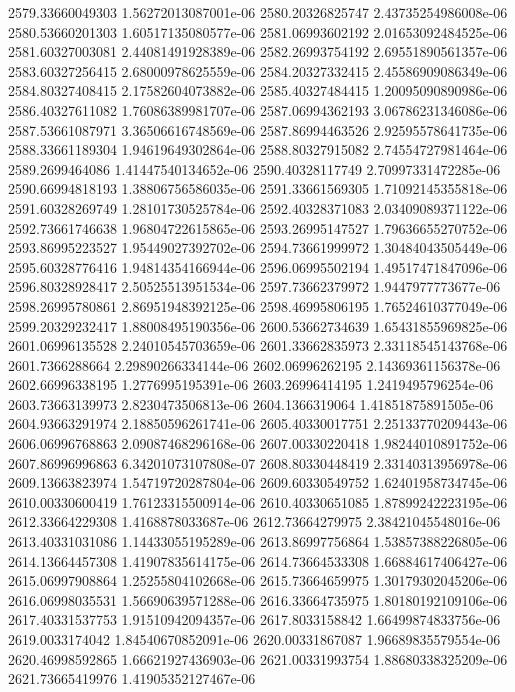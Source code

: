 {2579.33660049303 1.56272013087001e-06
2580.20326825747 2.43735254986008e-06
2580.53660201303 1.60517135080577e-06
2581.06993602192 2.01653092484525e-06
2581.60327003081 2.44081491928389e-06
2582.26993754192 2.69551890561357e-06
2583.60327256415 2.68000978625559e-06
2584.20327332415 2.45586909086349e-06
2584.80327408415 2.17582604073882e-06
2585.40327484415 1.20095090890986e-06
2586.40327611082 1.76086389981707e-06
2587.06994362193 3.06786231346086e-06
2587.53661087971 3.36506616748569e-06
2587.86994463526 2.92595578641735e-06
2588.33661189304 1.94619649302864e-06
2588.80327915082 2.74554727981464e-06
2589.2699464086 1.41447540134652e-06
2590.40328117749 2.70997331472285e-06
2590.66994818193 1.38806756586035e-06
2591.33661569305 1.71092145355818e-06
2591.60328269749 1.28101730525784e-06
2592.40328371083 2.03409089371122e-06
2592.73661746638 1.96804722615865e-06
2593.26995147527 1.79636655270752e-06
2593.86995223527 1.95449027392702e-06
2594.73661999972 1.30484043505449e-06
2595.60328776416 1.94814354166944e-06
2596.06995502194 1.49517471847096e-06
2596.80328928417 2.50525513951534e-06
2597.73662379972 1.9447977773677e-06
2598.26995780861 2.86951948392125e-06
2598.46995806195 1.76524610377049e-06
2599.20329232417 1.88008495190356e-06
2600.53662734639 1.65431855969825e-06
2601.06996135528 2.24010545703659e-06
2601.33662835973 2.33118545143768e-06
2601.7366288664 2.29890266334144e-06
2602.06996262195 2.14369361156378e-06
2602.66996338195 1.2776995195391e-06
2603.26996414195 1.2419495796254e-06
2603.73663139973 2.8230473506813e-06
2604.1366319064 1.41851875891505e-06
2604.93663291974 2.18850596261741e-06
2605.40330017751 2.25133770209443e-06
2606.06996768863 2.09087468296168e-06
2607.00330220418 1.98244010891752e-06
2607.86996996863 6.34201073107808e-07
2608.80330448419 2.33140313956978e-06
2609.13663823974 1.54719720287804e-06
2609.60330549752 1.62401958734745e-06
2610.00330600419 1.76123315500914e-06
2610.40330651085 1.87899242223195e-06
2612.33664229308 1.4168878033687e-06
2612.73664279975 2.38421045548016e-06
2613.40331031086 1.14433055195289e-06
2613.86997756864 1.53857388226805e-06
2614.13664457308 1.41907835614175e-06
2614.73664533308 1.66884617406427e-06
2615.06997908864 1.25255804102668e-06
2615.73664659975 1.30179302045206e-06
2616.06998035531 1.56690639571288e-06
2616.33664735975 1.80180192109106e-06
2617.40331537753 1.91510942094357e-06
2617.8033158842 1.66499874833756e-06
2619.0033174042 1.84540670852091e-06
2620.00331867087 1.96689835579554e-06
2620.46998592865 1.66621927436903e-06
2621.00331993754 1.88680338325209e-06
2621.73665419976 1.41905352127467e-06
}
